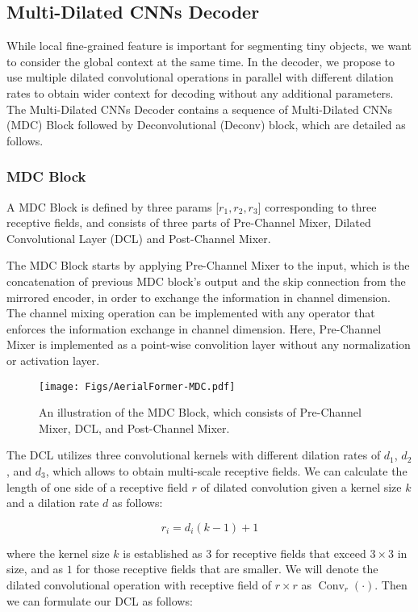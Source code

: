 \documentclass[journal]{IEEEtran}
\begin{document}
\subsection{Multi-Dilated CNNs Decoder}
While local fine-grained feature is important for segmenting tiny objects, we want to consider the global context at the same time.
In the decoder, we propose to use multiple dilated convolutional operations in parallel with different dilation rates to obtain wider context for decoding without any additional parameters. The Multi-Dilated CNNs Decoder contains a sequence of Multi-Dilated CNNs (MDC) Block followed by Deconvolutional (Deconv) block, which are detailed as follows.

\subsubsection{MDC Block}
A MDC Block is defined by three params [$r_1, r_2, r_3$] corresponding to three receptive fields, and consists of three parts of Pre-Channel Mixer, Dilated Convolutional Layer (DCL) and Post-Channel Mixer.


The MDC Block starts by applying Pre-Channel Mixer to the input, which is the concatenation of previous MDC block's output and the skip connection from the mirrored encoder, in order to exchange the information in channel dimension. The channel mixing operation can be implemented with any operator that enforces the information exchange in channel dimension. Here, Pre-Channel Mixer is implemented as a point-wise convolition layer without any normalization or activation layer.


\begin{figure}
    \centering
    \texttt{[image: Figs/AerialFormer-MDC.pdf]}
    \caption{An illustration of the MDC Block, which consists of Pre-Channel Mixer, DCL, and Post-Channel Mixer.}
    \label{fig:mdc}
\end{figure}

The DCL utilizes three convolutional kernels with different dilation rates of $d_1$, $d_2$, and $d_3$, which allows to obtain multi-scale receptive fields.   
We can calculate the length of one side of a receptive field $r$ of dilated convolution given a kernel size $k$ and a dilation rate $d$ as follows:  

\begin{equation}
    r_i = d_i (k - 1) + 1
\end{equation}

where the kernel size $k$ is established as $3$ for receptive fields that exceed $3\times 3$ in size, and as $1$ for those receptive fields that are smaller. 
We will denote the dilated convolutional operation with receptive field of $r \times r$ as $\operatorname{Conv}_r(\cdot)$. Then we can formulate our DCL as follows: 
\end{document}
